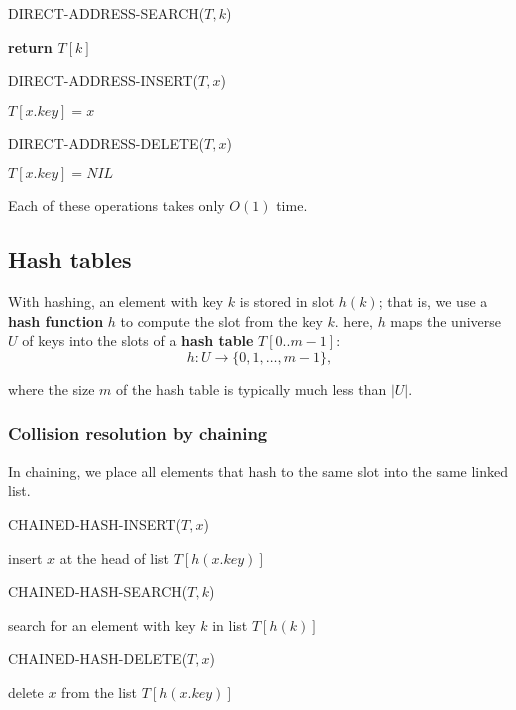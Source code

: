 \documentclass[12pt]{article}
\begin{document}
DIRECT-ADDRESS-SEARCH($T, k$)
\begin{algorithmic}[1]
\State \textbf {return} $T[k]$
\end{algorithmic}

DIRECT-ADDRESS-INSERT($T, x$)
\begin{algorithmic}[1]
\State $T[x.key] = x$
\end{algorithmic}

DIRECT-ADDRESS-DELETE($T, x$)
\begin{algorithmic}[1]
\State $T[x.key] = NIL$
\end{algorithmic}

Each of these operations takes only $O(1)$ time.

\subsection{Hash tables}

With hashing, an element with key $k$ is stored in slot $h(k)$; that is, we use a \textbf {hash function} $h$ to compute the slot from the key $k$. here, $h$ maps the universe $U$ of keys into the slots of a \textbf {hash table} $T[0..m-1]$:
\begin{equation*}
  h: U \rightarrow \{ 0,1, \dots, m-1 \},
\end{equation*}

where the size $m$ of the hash table is typically much less than $|U|$.

\subsubsection*{Collision resolution by chaining}

In chaining, we place all elements that hash to the same slot into the same linked list.

CHAINED-HASH-INSERT($T, x$)
\begin{algorithmic}[1]
\State insert $x$ at the head of list $T[h(x.key)]$
\end{algorithmic}

CHAINED-HASH-SEARCH($T, k$)
\begin{algorithmic}[1]
\State search for an element with key $k$ in list $T[h(k)]$
\end{algorithmic}

CHAINED-HASH-DELETE($T, x$)
\begin{algorithmic}[1]
\State delete $x$ from the list $T[h(x.key)]$
\end{algorithmic}
\end{document}

